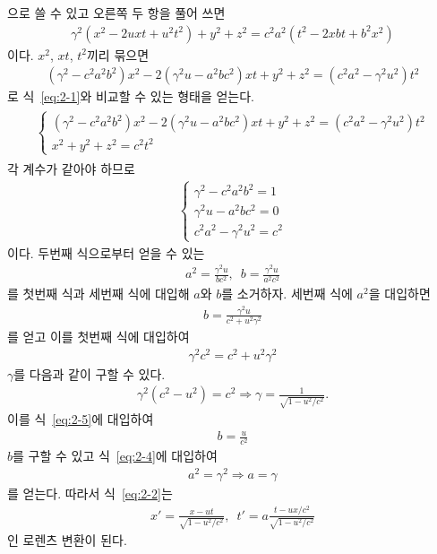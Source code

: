 \documentclass[tightenlines,floatfix,nofootinbib,superscriptaddress,fleqn]{revtex4}
\begin{document}
으로 쓸 수 있고 오른쪽 두 항을 풀어 쓰면
\begin{align}
  \gamma^2(x^2-2uxt+u^2t^2)+y^2+z^2 = c^2a^2(t^2-2xbt+b^2x^2)
\end{align}
이다. $x^2$, $xt$, $t^2$끼리 묶으면
\begin{align}
  (\gamma^2-c^2a^2b^2)x^2-2(\gamma^2u-a^2bc^2)xt+y^2+z^2
  =(c^2a^2-\gamma^2u^2)t^2
\end{align}
로 식~\eqref{eq:2-1}와 비교할 수 있는 형태을 얻는다.
\begin{align}
  \begin{split}
    \begin{cases}
      (\gamma^2-c^2a^2b^2)x^2-2(\gamma^2u-a^2bc^2)xt+y^2+z^2
      =(c^2a^2-\gamma^2u^2)t^2 \\
      x^2+y^2+z^2 =  c^2t^2
    \end{cases}
  \end{split}
\end{align}
각 계수가 같아야 하므로
\begin{align}
    \begin{cases}
    \gamma^2-c^2a^2b^2 = 1 \\
    \gamma^2u-a^2bc^2 = 0 \\
    c^2a^2-\gamma^2u^2 = c^2
  \end{cases}
\end{align}
이다. 두번째 식으로부터 얻을 수 있는
\begin{align}\label{eq:2-4}
  a^2 = \frac{\gamma^2u}{bc^2},\,\,\,b = \frac{\gamma^2u}{a^2c^2}
\end{align}
를 첫번째 식과 세번째 식에 대입해 $a$와 $b$를 소거하자. 세번째 식에 
$a^2$을 대입하면 
\begin{align}\label{eq:2-5}
  b = \frac{\gamma^2u}{c^2+u^2\gamma^2}
\end{align}
를 얻고 이를 첫번째 식에 대입하여
\begin{align}
  \gamma^2c^2=c^2+u^2\gamma^2
\end{align}
$\gamma$를 다음과 같이 구할 수 있다.
\begin{align}
  \gamma^2(c^2-u^2)=c^2
  \Longrightarrow \gamma = \frac{1}{\sqrt{1-u^2/c^2}}.
\end{align}
이를 식~\eqref{eq:2-5}에 대입하여
\begin{align}
  b = \frac{u}{c^2}
\end{align}
$b$를 구할 수 있고 식~\eqref{eq:2-4}에 대입하여
\begin{align}
  a^2=\gamma^2\Longrightarrow a= \gamma
\end{align}
를 얻는다. 따라서 식~\eqref{eq:2-2}는
\begin{align}
  x'=\frac{x-ut}{\sqrt{1-u^2/c^2}},\,\,\,t'=a\frac{t-ux/c^2}{\sqrt{1-u^2/c^2}}
\end{align}
인 로렌츠 변환이 된다.
\end{document}
